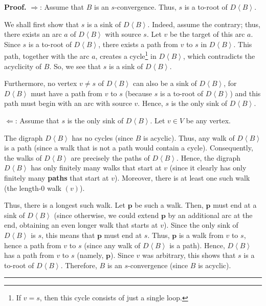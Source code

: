 \documentclass[numbers=enddot,12pt,final,onecolumn,notitlepage]{scrartcl}%
\theoremstyle{definition}
\newenvironment{proof}[1][Proof]{\noindent\textbf{#1.} }{\ \rule{0.5em}{0.5em}}
\theoremstyle{plainsl}
\begin{document}
\begin{proof}
$\Longrightarrow$: Assume that $B$ is an $s$-convergence. Thus, $s$ is a
to-root of $D\left\langle B\right\rangle $.

We shall first show that $s$ is a sink of $D\left\langle B\right\rangle $.
Indeed, assume the contrary; thus, there exists an arc $a$ of $D\left\langle
B\right\rangle $ with source $s$. Let $v$ be the target of this arc $a$. Since
$s$ is a to-root of $D\left\langle B\right\rangle $, there exists a path from
$v$ to $s$ in $D\left\langle B\right\rangle $. This path, together with the
arc $a$, creates a cycle\footnote{If $v=s$, then this cycle consists of just a
single loop.} in $D\left\langle B\right\rangle $, which contradicts the
acyclicity of $B$. So, we see that $s$ is a sink of $D\left\langle
B\right\rangle $.

Furthermore, no vertex $v\neq s$ of $D\left\langle B\right\rangle $ can also
be a sink of $D\left\langle B\right\rangle $, for $D\left\langle
B\right\rangle $ must have a path from $v$ to $s$ (because $s$ is a to-root of
$D\left\langle B\right\rangle $) and this path must begin with an arc with
source $v$. Hence, $s$ is the only sink of $D\left\langle B\right\rangle $.
\medskip

$\Longleftarrow$: Assume that $s$ is the only sink of $D\left\langle
B\right\rangle $. Let $v\in V$ be any vertex.

The digraph $D\left\langle B\right\rangle $ has no cycles (since $B$ is
acyclic). Thus, any walk of $D\left\langle B\right\rangle $ is a path (since a
walk that is not a path would contain a cycle). Consequently, the walks of
$D\left\langle B\right\rangle $ are precisely the paths of $D\left\langle
B\right\rangle $. Hence, the digraph $D\left\langle B\right\rangle $ has only
finitely many walks that start at $v$ (since it clearly has only finitely many
\textbf{paths} that start at $v$). Moreover, there is at least one such walk
(the length-$0$ walk $\left(  v\right)  $).

Thus, there is a longest such walk. Let $\mathbf{p}$ be such a walk. Then,
$\mathbf{p}$ must end at a sink of $D\left\langle B\right\rangle $ (since
otherwise, we could extend $\mathbf{p}$ by an additional arc at the end,
obtaining an even longer walk that starts at $v$). Since the only sink of
$D\left\langle B\right\rangle $ is $s$, this means that $\mathbf{p}$ must end
at $s$. Thus, $\mathbf{p}$ is a walk from $v$ to $s$, hence a path from $v$ to
$s$ (since any walk of $D\left\langle B\right\rangle $ is a path). Hence,
$D\left\langle B\right\rangle $ has a path from $v$ to $s$ (namely,
$\mathbf{p}$). Since $v$ was arbitrary, this shows that $s$ is a to-root of
$D\left\langle B\right\rangle $. Therefore, $B$ is an $s$-convergence (since
$B$ is acyclic).
\end{proof}
\end{document}
